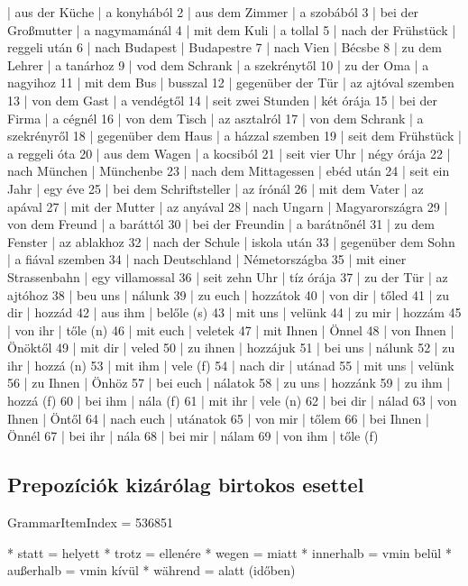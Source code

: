 \documentclass{article}
\newenvironment{desc}{\verbatim}{\endverbatim}
\newenvironment{exmp}{\verbatim}{\endverbatim}
\begin{document}
\begin{exmp}
1 | aus der Küche | a konyhából
2 | aus dem Zimmer | a szobából
3 | bei der Großmutter | a nagymamánál
4 | mit dem Kuli | a tollal
5 | nach der Frühstück | reggeli után
6 | nach Budapest | Budapestre
7 | nach Vien | Bécsbe
8 | zu dem Lehrer | a tanárhoz
9 | vod dem Schrank | a szekrénytől
10 | zu der Oma | a nagyihoz
11 | mit dem Bus | busszal
12 | gegenüber der Tür | az ajtóval szemben
13 | von dem Gast | a vendégtől
14 | seit zwei Stunden | két órája
15 | bei der Firma | a cégnél
16 | von dem Tisch | az asztalról
17 | von dem Schrank | a szekrényről
18 | gegenüber dem Haus | a házzal szemben
19 | seit dem Frühstück | a reggeli óta
20 | aus dem Wagen | a kocsiból
21 | seit vier Uhr | négy órája
22 | nach München | Münchenbe
23 | nach dem Mittagessen | ebéd után
24 | seit ein Jahr | egy éve
25 | bei dem Schriftsteller | az írónál
26 | mit dem Vater | az apával
27 | mit der Mutter | az anyával
28 | nach Ungarn | Magyarországra
29 | von dem Freund | a baráttól
30 | bei der Freundin | a barátnőnél
31 | zu dem Fenster | az ablakhoz
32 | nach der Schule | iskola után
33 | gegenüber dem Sohn | a fiával szemben
34 | nach Deutschland | Németországba
35 | mit einer Strassenbahn | egy villamossal
36 | seit zehn Uhr | tíz órája
37 | zu der Tür | az ajtóhoz
38 | beu uns | nálunk
39 | zu euch | hozzátok
40 | von dir | tőled
41 | zu dir | hozzád
42 | aus ihm | belőle (s)
43 | mit uns | velünk
44 | zu mir | hozzám
45 | von ihr | tőle (n)
46 | mit euch | veletek
47 | mit Ihnen | Önnel
48 | von Ihnen | Önöktől
49 | mit dir | veled
50 | zu ihnen | hozzájuk
51 | bei uns | nálunk
52 | zu ihr | hozzá (n)
53 | mit ihm | vele (f)
54 | nach dir | utánad
55 | mit uns | velünk
56 | zu Ihnen | Önhöz
57 | bei euch | nálatok
58 | zu uns | hozzánk
59 | zu ihm | hozzá (f)
60 | bei ihm | nála (f)
61 | mit ihr | vele (n)
62 | bei dir | nálad
63 | von Ihnen | Öntől
64 | nach euch | utánatok
65 | von mir | tőlem
66 | bei Ihnen | Önnél
67 | bei ihr | nála
68 | bei mir | nálam
69 | von ihm | tőle (f)
\end{exmp}

\subsection{Prepozíciók kizárólag birtokos esettel}

GrammarItemIndex = 536851

\begin{desc}
* statt = helyett
* trotz = ellenére
* wegen = miatt
* innerhalb = vmin belül
* außerhalb = vmin kívül
* während = alatt (időben)
\end{desc}
\end{document}
